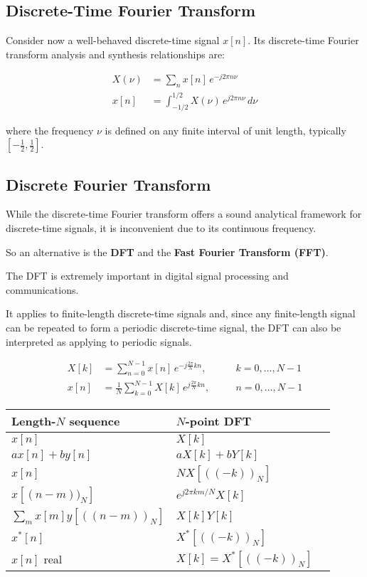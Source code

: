 \subsection{Discrete-Time Fourier Transform}

Consider now a well-behaved discrete-time signal $x[n]$.  
Its discrete-time Fourier transform analysis and synthesis relationships are:

\begin{align}
X(\nu) &= \sum_{n} x[n]\,e^{-j 2\pi n \nu} \tag{A.7} \\[6pt]
x[n] &= \int_{-1/2}^{1/2} X(\nu)\,e^{j 2\pi n \nu}\,d\nu \tag{A.8}
\end{align}

where the frequency $\nu$ is defined on any finite interval of unit length, typically $[-\tfrac{1}{2}, \tfrac{1}{2}]$.

\subsection{Discrete Fourier Transform}

While the discrete-time Fourier transform offers a sound analytical framework for discrete-time signals, it is inconvenient due to its continuous frequency.

So an alternative is the \textbf{DFT} and the \textbf{Fast Fourier Transform (FFT)}.

The DFT is extremely important in digital signal processing and communications.

It applies to finite-length discrete-time signals and, since any finite-length signal can be repeated to form a periodic discrete-time signal, the DFT can also be interpreted as applying to periodic signals.

\begin{align}
X[k] &= \sum_{n=0}^{N-1} x[n]\,e^{-j\frac{2\pi}{N}kn}, \quad && k = 0, \ldots, N-1 \tag{A.9} \\[6pt]
x[n] &= \frac{1}{N} \sum_{k=0}^{N-1} X[k]\,e^{j\frac{2\pi}{N}kn}, \quad && n = 0, \ldots, N-1 \tag{A.10}
\end{align}

\begin{center}
\begin{tabular}{@{}lll@{}}
\toprule
\textbf{Length-$N$ sequence} & \textbf{$N$-point DFT} \\ \midrule
$x[n]$ & $X[k]$ \\
$a x[n] + b y[n]$ & $a X[k] + b Y[k]$ \\
$x[n]$ & $N X[((-k))_N]$ \\
$x[(n - m))_N]$ & $e^{j 2\pi k m / N} X[k]$ \\
$\sum\limits_m x[m] y[((n - m))_N]$ & $X[k] Y[k]$ \\
$x^*[n]$ & $X^*[((-k))_N]$ \\
$x[n]$ real & $X[k] = X^*[((-k))_N]$ \\ 
\bottomrule
\end{tabular}
\end{center}

